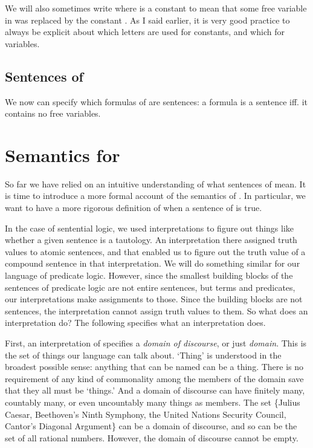 We will also sometimes write \p{\phi(\kappa)} where \p{\kappa} is a constant to 
mean that some free variable in \p{\phi} was replaced by the constant   
\p{\kappa}. As I said earlier, it is very good practice to always be explicit 
about which letters are used for constants, and which for variables.


\subsection{Sentences of \lL[Q]{}}

We now can specify which formulas of \lL[Q]{} are sentences: a formula \lL[Q]{} 
is a sentence iff. it contains no free variables.






\section{Semantics for \lL[Q]}\label{sec:semanticsPL}

So far we have relied on an intuitive understanding of what sentences of \lL[Q]{} 
mean. It is time to introduce a more formal account of the semantics of \lL[Q].  
In particular, we want to have a more rigorous definition of when a sentence of 
\lL[Q]{} is true.

In the case of sentential logic, we used interpretations to figure out things 
like whether a given sentence is a tautology. An interpretation there assigned 
truth values to atomic sentences, and that enabled us to figure out the truth 
value of a compound sentence in that interpretation. We will do something 
similar for our language of predicate logic. However, since the smallest 
building blocks of the sentences of predicate logic are not entire sentences, 
but terms and predicates, our interpretations make assignments to those. Since 
the building blocks are not sentences, the interpretation cannot  assign truth 
values to them. So what does an interpretation do?  The following specifies what 
an interpretation does.


  
First, an interpretation of \lL[Q]{} specifies a \emph{domain of discourse}, or 
just \emph{domain}.  This is the set of things our language \lL[Q]{} can talk 
about.  `Thing' is understood in the broadest possible sense: anything that can 
be named can be a thing. There is no requirement of any kind of commonality 
among the members of the domain save that they all must be `things.' And a 
domain of discourse can have finitely many, countably many, or even uncountably 
many things as members. The set \{Julius Caesar, Beethoven's Ninth Symphony, the 
United Nations Security Council, Cantor's Diagonal Argument\} can be a  domain 
of discourse, and so can be the set of all rational numbers.  However, the 
domain of discourse cannot be empty.

